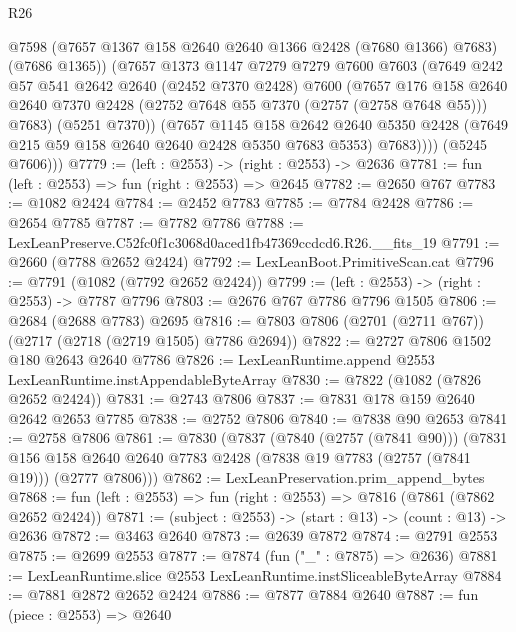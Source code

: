 \begin{lexlean}{R26}
\begin{coremodule}
              @7598
              (@7657 @1367 @158 @2640 @2640 @1366 @2428 (@7680 @1366) @7683)
              (@7686 @1365))
            (@7657
              @1373
              @1147
              @7279
              @7279
              @7600
              @7603
              (@7649
                @242
                @57
                @541
                @2642
                @2640
                (@2452 @7370 @2428)
                @7600
                (@7657
                  @176
                  @158
                  @2640
                  @2640
                  @7370
                  @2428
                  (@2752 @7648 @55 @7370 (@2757 (@2758 @7648 @55)))
                  @7683)
                (@5251 @7370))
              (@7657
                @1145
                @158
                @2642
                @2640
                @5350
                @2428
                (@7649 @215 @59 @158 @2640 @2640 @2428 @5350 @7683 @5353)
                @7683))))
        (@5245 @7606)))
@7779 := (left : @2553) -> (right : @2553) -> @2636
@7781 := fun (left : @2553) => fun (right : @2553) => @2645
@7782 := @2650 @767
@7783 := @1082 @2424
@7784 := @2452 @7783
@7785 := @7784 @2428
@7786 := @2654 @7785
@7787 := @7782 @7786
@7788 := LexLeanPreserve.C52fc0f1c3068d0aced1fb47369ccdcd6.R26.__fits_19
@7791 := @2660 (@7788 @2652 @2424)
@7792 := LexLeanBoot.PrimitiveScan.cat
@7796 := @7791 (@1082 (@7792 @2652 @2424))
@7799 := (left : @2553) -> (right : @2553) -> @7787 @7796
@7803 := @2676 @767 @7786 @7796 @1505
@7806 := @2684 (@2688 @7783) @2695
@7816 := @7803 @7806 (@2701 (@2711 @767)) (@2717 (@2718 (@2719 @1505) @7786 @2694))
@7822 := @2727 @7806 @1502 @180 @2643 @2640 @7786
@7826 := LexLeanRuntime.append @2553 LexLeanRuntime.instAppendableByteArray
@7830 := @7822 (@1082 (@7826 @2652 @2424))
@7831 := @2743 @7806
@7837 := @7831 @178 @159 @2640 @2642 @2653 @7785
@7838 := @2752 @7806
@7840 := @7838 @90 @2653
@7841 := @2758 @7806
@7861 := @7830
    (@7837
      (@7840 (@2757 (@7841 @90)))
      (@7831 @156 @158 @2640 @2640 @7783 @2428 (@7838 @19 @7783 (@2757 (@7841 @19))) (@2777 @7806)))
@7862 := LexLeanPreservation.prim_append_bytes
@7868 := fun (left : @2553) => fun (right : @2553) => @7816 (@7861 (@7862 @2652 @2424))
@7871 := (subject : @2553) -> (start : @13) -> (count : @13) -> @2636
@7872 := @3463 @2640
@7873 := @2639 @7872
@7874 := @2791 @2553
@7875 := @2699 @2553
@7877 := @7874 (fun ("_" : @7875) => @2636)
@7881 := LexLeanRuntime.slice @2553 LexLeanRuntime.instSliceableByteArray
@7884 := @7881 @2872 @2652 @2424
@7886 := @7877 @7884 @2640
@7887 := fun (piece : @2553) => @2640

\end{coremodule}
\end{lexlean}
